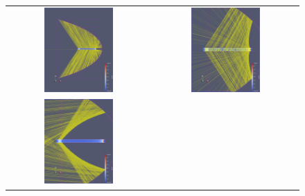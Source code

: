\documentclass[a4paper,10pt]{article}
\begin{document}
    \begin{figure}
        \centering
        \begin{tabular}{c c}
            \includegraphics[width=0.5\textwidth]{images/fixed_rand/1.png} &
            \includegraphics[width=0.5\textwidth]{images/fixed_rand/2.png} \\
            \includegraphics[width=0.5\textwidth]{images/fixed_rand/3.png} &

\end{tabular}
\end{figure}
\end{document}
